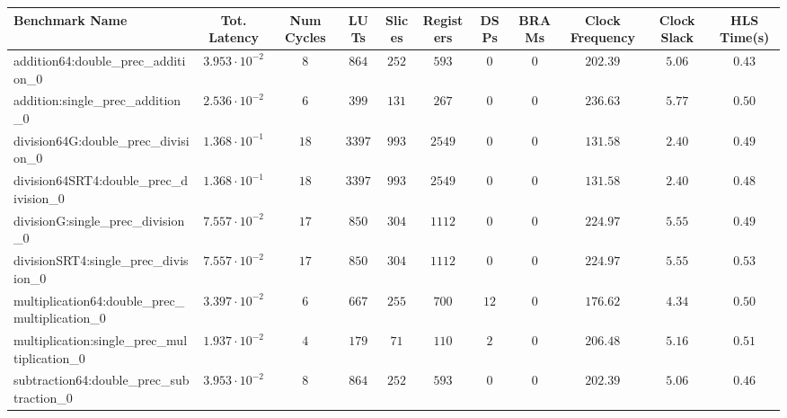 \begin{tabular}{|l|c|c|c|c|c|c|c|c|c|c|}
\hline
Benchmark Name                                   & Tot. Latency            & Num Cycles & LUTs      & Slices   & Registers & DSPs   & BRAMs & Clock Frequency & Clock Slack & HLS Time(s) \\
\hline
addition64:double\_prec\_addition\_0             & $ 3.953 \cdot 10^{-2} $ & $ 8      $ & $ 864   $ & $ 252  $ & $ 593   $ & $ 0  $ & $ 0 $ & $ 202.39      $ & $ 5.06    $ & $ 0.43    $ \\
addition:single\_prec\_addition\_0               & $ 2.536 \cdot 10^{-2} $ & $ 6      $ & $ 399   $ & $ 131  $ & $ 267   $ & $ 0  $ & $ 0 $ & $ 236.63      $ & $ 5.77    $ & $ 0.50    $ \\
division64G:double\_prec\_division\_0            & $ 1.368 \cdot 10^{-1} $ & $ 18     $ & $ 3397  $ & $ 993  $ & $ 2549  $ & $ 0  $ & $ 0 $ & $ 131.58      $ & $ 2.40    $ & $ 0.49    $ \\
division64SRT4:double\_prec\_division\_0         & $ 1.368 \cdot 10^{-1} $ & $ 18     $ & $ 3397  $ & $ 993  $ & $ 2549  $ & $ 0  $ & $ 0 $ & $ 131.58      $ & $ 2.40    $ & $ 0.48    $ \\
divisionG:single\_prec\_division\_0              & $ 7.557 \cdot 10^{-2} $ & $ 17     $ & $ 850   $ & $ 304  $ & $ 1112  $ & $ 0  $ & $ 0 $ & $ 224.97      $ & $ 5.55    $ & $ 0.49    $ \\
divisionSRT4:single\_prec\_division\_0           & $ 7.557 \cdot 10^{-2} $ & $ 17     $ & $ 850   $ & $ 304  $ & $ 1112  $ & $ 0  $ & $ 0 $ & $ 224.97      $ & $ 5.55    $ & $ 0.53    $ \\
multiplication64:double\_prec\_multiplication\_0 & $ 3.397 \cdot 10^{-2} $ & $ 6      $ & $ 667   $ & $ 255  $ & $ 700   $ & $ 12 $ & $ 0 $ & $ 176.62      $ & $ 4.34    $ & $ 0.50    $ \\
multiplication:single\_prec\_multiplication\_0   & $ 1.937 \cdot 10^{-2} $ & $ 4      $ & $ 179   $ & $ 71   $ & $ 110   $ & $ 2  $ & $ 0 $ & $ 206.48      $ & $ 5.16    $ & $ 0.51    $ \\
subtraction64:double\_prec\_subtraction\_0       & $ 3.953 \cdot 10^{-2} $ & $ 8      $ & $ 864   $ & $ 252  $ & $ 593   $ & $ 0  $ & $ 0 $ & $ 202.39      $ & $ 5.06    $ & $ 0.46    $ \\

\end{tabular}
